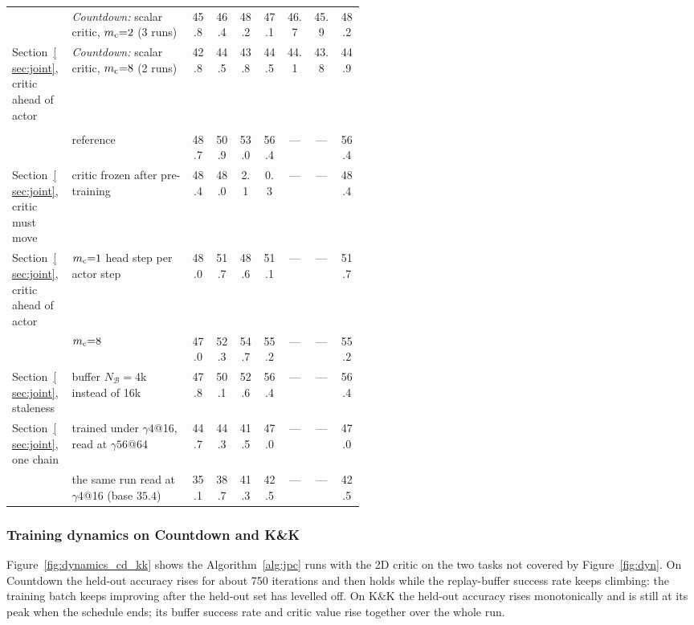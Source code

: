 \begin{table}[H]
\begin{tabular}{@{}>{\raggedright\arraybackslash}p{0.17\linewidth}>{\raggedright\arraybackslash}p{0.34\linewidth}cccccc|c@{}}
 & \emph{Countdown:} scalar critic, $m_{\rm c}{=}2$ (3 runs) & 45.8 & 46.4 & 48.2 & 47.1 & 46.7 & 45.9 & 48.2 \\
Section~\ref{sec:joint}, critic ahead of actor & \emph{Countdown:} scalar critic, $m_{\rm c}{=}8$ (2 runs) & 42.8 & 44.5 & 43.8 & 44.5 & 44.1 & 43.8 & 44.9 \\
\midrule
\midrule
\multicolumn{9}{@{}l}{\emph{C. 1000 iterations, constant learning rate $10^{-6}$, five-step buffer}}\\
 & reference & 48.7 & 50.9 & 53.0 & 56.4 & --- & --- & 56.4 \\
Section~\ref{sec:joint}, critic must move & critic frozen after pre-training & 48.4 & 48.0 & \phantom{0}2.1 & \phantom{0}0.3 & --- & --- & 48.4 \\
Section~\ref{sec:joint}, critic ahead of actor & $m_{\rm c}{=}1$ head step per actor step & 48.0 & 51.7 & 48.6 & 51.1 & --- & --- & 51.7 \\
 & $m_{\rm c}{=}8$ & 47.0 & 52.3 & 54.7 & 55.2 & --- & --- & 55.2 \\
Section~\ref{sec:joint}, staleness & buffer $N_{\mathcal B}{=}4$k instead of 16k & 47.8 & 50.1 & 52.6 & 56.4 & --- & --- & 56.4 \\
Section~\ref{sec:joint}, one chain & trained under $\gamma4$@16, read at $\gamma56$@64 & 44.7 & 44.3 & 41.5 & 47.0 & --- & --- & 47.0 \\
 & \quad the same run read at $\gamma4$@16 (base $35.4$) & 35.1 & 38.7 & 41.3 & 42.5 & --- & --- & 42.5 \\
\bottomrule
\end{tabular}
\end{table}

\fi


\subsubsection{Training dynamics on Countdown and K\&K}
\label{app:dynamics}
Figure~\ref{fig:dynamics_cd_kk} shows the Algorithm~\ref{alg:jpc} runs with the 2D critic on the two tasks not covered by Figure~\ref{fig:dyn}. On Countdown the held-out accuracy rises for about 750 iterations and then holds while the replay-buffer success rate keeps climbing: the training batch keeps improving after the held-out set has levelled off. On K\&K the held-out accuracy rises monotonically and is still at its peak when the schedule ends; its buffer success rate and critic value rise together over the whole run.

